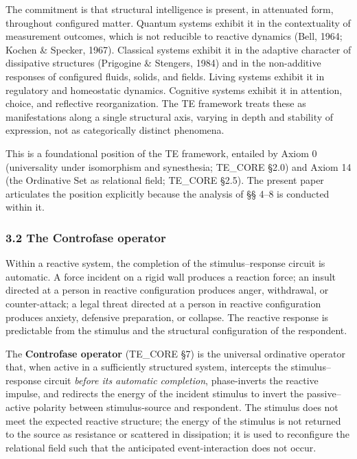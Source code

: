 \documentclass[
  11pt,
  a4paper,
]{article}
\begin{document}
The commitment is that structural intelligence is present, in attenuated
form, throughout configured matter. Quantum systems exhibit it in the
contextuality of measurement outcomes, which is not reducible to
reactive dynamics (Bell, 1964; Kochen \& Specker, 1967). Classical
systems exhibit it in the adaptive character of dissipative structures
(Prigogine \& Stengers, 1984) and in the non-additive responses of
configured fluids, solids, and fields. Living systems exhibit it in
regulatory and homeostatic dynamics. Cognitive systems exhibit it in
attention, choice, and reflective reorganization. The TE framework
treats these as manifestations along a single structural axis, varying
in depth and stability of expression, not as categorically distinct
phenomena.

This is a foundational position of the TE framework, entailed by Axiom 0
(universality under isomorphism and synesthesia; TE\_CORE §2.0) and
Axiom 14 (the Ordinative Set as relational field; TE\_CORE §2.5). The
present paper articulates the position explicitly because the analysis
of §§ 4--8 is conducted within it.

\subsubsection{3.2 The Controfase
operator}\label{the-controfase-operator}

Within a reactive system, the completion of the stimulus--response
circuit is automatic. A force incident on a rigid wall produces a
reaction force; an insult directed at a person in reactive configuration
produces anger, withdrawal, or counter-attack; a legal threat directed
at a person in reactive configuration produces anxiety, defensive
preparation, or collapse. The reactive response is predictable from the
stimulus and the structural configuration of the respondent.

The \textbf{Controfase operator} (TE\_CORE §7) is the universal
ordinative operator that, when active in a sufficiently structured
system, intercepts the stimulus--response circuit \emph{before its
automatic completion}, phase-inverts the reactive impulse, and redirects
the energy of the incident stimulus to invert the passive--active
polarity between stimulus-source and respondent. The stimulus does not
meet the expected reactive structure; the energy of the stimulus is not
returned to the source as resistance or scattered in dissipation; it is
used to reconfigure the relational field such that the anticipated
event-interaction does not occur.
\end{document}
